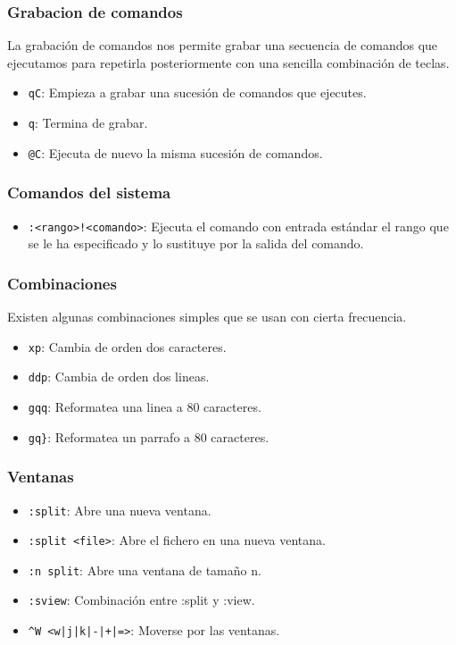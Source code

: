 \documentclass[10pt]{beamer}
\begin{document}
  \begin{frame}[containsverbatim]
    \frametitle{Grabacion de comandos}
    La grabación de comandos nos permite grabar una secuencia de comandos que
    ejecutamos para repetirla posteriormente con una sencilla combinación de
    teclas.
    \begin{itemize}
      \item \verb+qC+: Empieza a grabar una sucesión de comandos que ejecutes.
      \item \verb+q+: Termina de grabar.
      \item \verb+@C+: Ejecuta de nuevo la misma sucesión de comandos.
    \end{itemize}
  \end{frame}
  
  \begin{frame}[containsverbatim]
    \frametitle{Comandos del sistema}

    \begin{itemize}
      \item \verb+:<rango>!<comando>+: Ejecuta el comando con entrada estándar
      el rango que se le ha especificado y lo sustituye por la salida del
      comando.
    \end{itemize}
  \end{frame}

  \begin{frame}[containsverbatim]
    \frametitle{Combinaciones}
    Existen algunas combinaciones simples que se usan con cierta frecuencia.
    \begin{itemize}
      \item \verb+xp+: Cambia de orden dos caracteres.
      \item \verb+ddp+: Cambia de orden dos lineas.
      \item \verb+gqq+: Reformatea una linea a 80 caracteres.
      \item \verb+gq}+: Reformatea un parrafo a 80 caracteres.
    \end{itemize}
  \end{frame}

  \begin{frame}[containsverbatim]
    \frametitle{Ventanas}
    \begin{itemize}
      \item \verb+:split+: Abre una nueva ventana.
      \item \verb+:split <file>+: Abre el fichero en una nueva ventana.
      \item \verb+:n split+: Abre una ventana de tamaño n.
      \item \verb+:sview+: Combinación entre :split y :view.
      \item \verb#^W <w|j|k|-|+|=>#: Moverse por las ventanas.
    \end{itemize}
  \end{frame}
  
\end{document}
